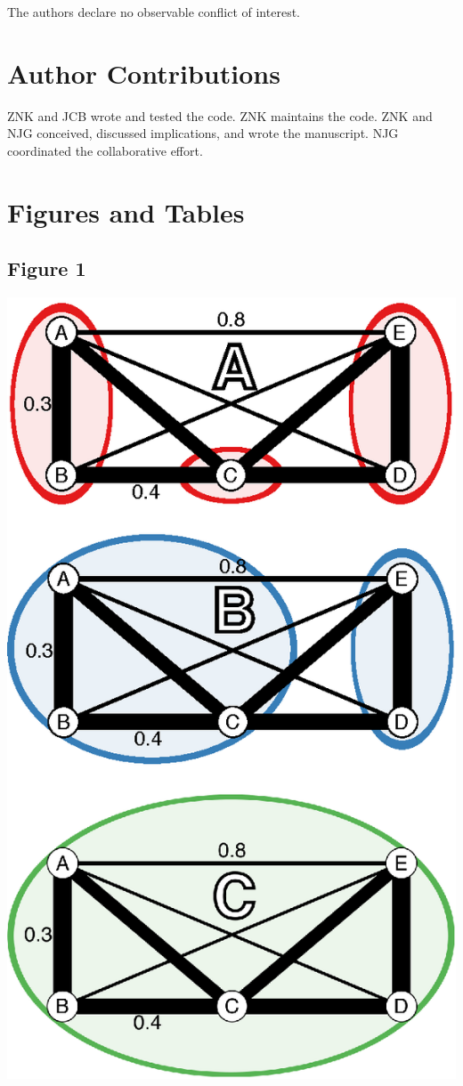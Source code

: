 \documentclass{frontiersSCNS} %
\begin{document}
The authors declare no observable conflict of interest.

\section*{Author Contributions}\label{author-contributions}

ZNK and JCB wrote and tested the code. ZNK maintains the code. ZNK and
NJG conceived, discussed implications, and wrote the manuscript. NJG
coordinated the collaborative effort.

\section*{Figures and Tables}\label{figures-and-tables}

\subsection*{Figure 1}\label{figure-1}

\includegraphics{poppr_frontiers_files/custom_figures/Figure-1.eps}
\end{document}
